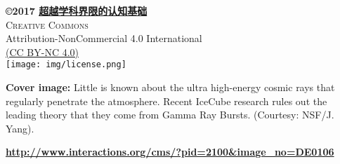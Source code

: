 	\AddToShipoutPicture*{\BackgroundPic}

	\begin{center}

	\end{center}

	\newpage
	\thispagestyle{empty}
	\phantom{hola!}

		
	\null
	\vfill
	\bc
		\begin{minipage}{0.65\textwidth}
			{\sffamily
				\bc
					\textbf{\copyright 2017 \href{http://toyhouse.cc/wiki/index.php/Seven_Brief_Lessons_on_Physics}{\textbf{超越学科界限的认知基础}}}\\
					\textsc{Creative Commons}\\
					Attribution-NonCommercial 4.0 International\\
					\href{http://creativecommons.org/licenses/by-nc/4.0/legalcode}{(CC BY-NC 4.0)}\\[12pt]
					\texttt{[image: img/license.png]}\\[12pt]
				\ec
	
				\small\textbf{Cover image:} Little is known about the ultra high-energy cosmic rays that regularly penetrate the atmosphere. Recent IceCube research rules out the leading theory that they come from Gamma Ray Bursts. (Courtesy: NSF/J. Yang).
			}
		\end{minipage}\vspace*{1ex}
		\small\href{http://www.interactions.org/cms/?pid=2100&image_no=DE0106}{\textbf{\url{http://www.interactions.org/cms/?pid=2100&image_no=DE0106}}}
	\ec
